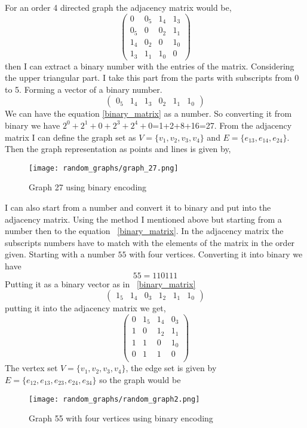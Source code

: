 \documentclass{Assignment}
\begin{document}
For an order 4 directed graph the adjacency matrix would be,
\begin{equation}
	\begin{pmatrix}
		0&0_5&1_4&1_3\\
		0_5&0&0_2&1_1\\
		1_4&0_2&0&1_0\\	
		1_3&1_1&1_0&0
	\end{pmatrix}\label{adj_mat}
\end{equation}
then I can extract a binary number with the entries of the matrix.
Considering the upper triangular part.
I take this part from the parts with subscripts from 0 to 5.
Forming a vector of a binary number.
\begin{equation}
	\begin{pmatrix}
		0_5&1_4&1_3&0_2&1_1&1_0
	\end{pmatrix}\label{binary_matrix}
\end{equation}
We can have the equation \ref{binary_matrix} as a number.
So converting it from binary we have $2^0+2^1+0+2^3+2^4+0$=1+2+8+16=27.
From the adjacency matrix I can define the graph set as $V =\{v_1,v_2,v_3,v_4\}$ and $E = \{e_{13} , e_{14},e_{24}\}$.
Then the graph representation as points and lines is given by,
\begin{figure}[H]
	\centering
	\texttt{[image: random\_graphs/graph\_27.png]}
	\caption{Graph 27 using binary encoding}
	\label{graph 27}
\end{figure}
I can also start from a number and convert it to binary and put into the adjacency matrix.
Using the method I mentioned above but starting from a number then to the equation ~\ref{binary_matrix}.
In the adjacency matrix the subscripts numbers have to match with the elements of the matrix in the order given.
Starting with a number $ 55$ with four vertices.
Converting it into binary we have 
$$55 = 1 1 0 111 $$
Putting it as a binary vector as in ~\ref{binary_matrix}
\begin{equation}
	\begin{pmatrix}
		1_5&1_4&0_3&1_2&1_1&1_0
	\end{pmatrix}
\end{equation}
putting it into the adjacency matrix we get,
\begin{equation}
	\begin{pmatrix}
		0& 1_5& 1_4& 0_3\\
		1 & 0 & 1_2 & 1_1\\
		1 & 1 & 0 & 1_0\\
		0 & 1 & 1 & 0\\
	\end{pmatrix}	
\end{equation}
The vertex set $V =\{v_1,v_2,v_3,v_4\}$, the edge set is given by $ E=\{e_{12}, e_{13}, e_{23}, e_{24},e_{34}\}$ so the graph would be
\begin{figure}[H]
	\centering
	\texttt{[image: random\_graphs/random\_graph2.png]}
	\caption{Graph 55 with four vertices using binary encoding}
	\label{random_graph2}
\end{figure}
\end{document}
